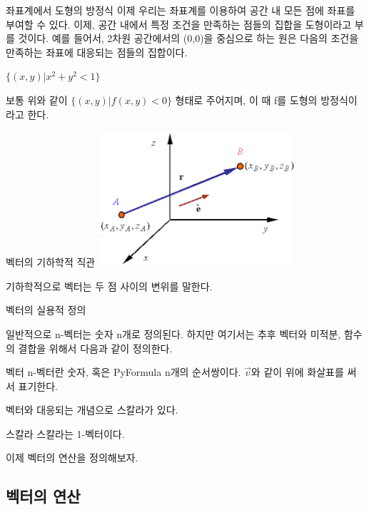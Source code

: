 \documentclass{beamer}
\begin{document}
\begin{frame}{좌표계에서 도형의 방정식} 
이제 우리는 좌표계를 이용하여 공간 내 모든 점에 좌표를 부여할 수 있다. 이제, 공간 내에서 특정 조건을 만족하는 점들의 집합을 도형이라고 부를 것이다. 예를 들어서, 2차원 공간에서의 (0,0)을 중심으로 하는 원은 다음의 조건을 만족하는 좌표에 대응되는 점들의 집합이다. 

$\{(x,y)|x^2+y^2<1\}$

보통 위와 같이 $\{(x,y)|f(x,y)<0\}$ 형태로 주어지며, 이 때 f를 도형의 방정식이라고 한다. 
\end{frame}


\begin{frame}{벡터의 기하학적 직관} 
\includegraphics[height=5cm,keepaspectratio]{vec}

기하학적으로 벡터는 두 점 사이의 변위를 말한다. 

\end{frame}

\begin{frame}{벡터의 실용적 정의 } 

일반적으로 n-벡터는 숫자 n개로 정의된다. 하지만 여기서는 추후 벡터와 미적분, 함수의 결합을 위해서 다음과 같이 정의한다. 

\begin{block}{벡터} 
n-벡터란 숫자, 혹은 PyFormula n개의 순서쌍이다. $\vec{v}$와 같이 위에 화살표를 써서 표기한다. 
\end{block} 

벡터와 대응되는 개념으로 스칼라가 있다. 

\begin{block}{스칼라} 
스칼라는 1-벡터이다. 
\end{block}

이제 벡터의 연산을 정의해보자. 

\end{frame}

\subsection{벡터의 연산} 
\end{document}
